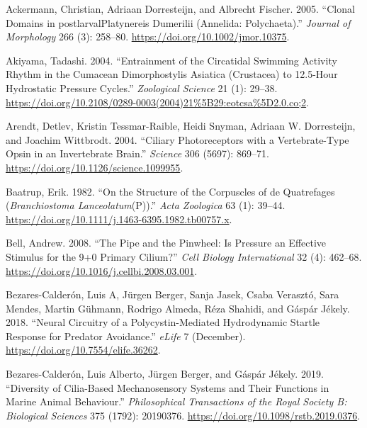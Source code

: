 \documentclass[
]{article}
\newlength{\cslhangindent}
\newlength{\cslentryspacingunit} %
\newenvironment{CSLReferences}[2] %
 {%
  \setlength{\parindent}{0pt}
  \ifodd #1
  \let\oldpar\par
  \def\par{\hangindent=\cslhangindent\oldpar}
  \fi
  \setlength{\parskip}{#2\cslentryspacingunit}
 }%
 {}
\begin{document}
\hypertarget{refs}{}
\begin{CSLReferences}{1}{0}
\leavevmode{}%
Ackermann, Christian, Adriaan Dorresteijn, and Albrecht Fischer. 2005.
{``Clonal Domains in postlarvalPlatynereis Dumerilii (Annelida:
Polychaeta).''} \emph{Journal of Morphology} 266 (3): 258--80.
\url{https://doi.org/10.1002/jmor.10375}.

\leavevmode{}%
Akiyama, Tadashi. 2004. {``Entrainment of the Circatidal Swimming
Activity Rhythm in the Cumacean Dimorphostylis Asiatica (Crustacea) to
12.5-Hour Hydrostatic Pressure Cycles.''} \emph{Zoological Science} 21
(1): 29--38.
\url{https://doi.org/10.2108/0289-0003(2004)21\%5B29:eotcsa\%5D2.0.co;2}.

\leavevmode{}%
Arendt, Detlev, Kristin Tessmar-Raible, Heidi Snyman, Adriaan W.
Dorresteijn, and Joachim Wittbrodt. 2004. {``Ciliary Photoreceptors with
a Vertebrate-Type Opsin in an Invertebrate Brain.''} \emph{Science} 306
(5697): 869--71. \url{https://doi.org/10.1126/science.1099955}.

\leavevmode{}%
Baatrup, Erik. 1982. {``On the Structure of the Corpuscles of de
Quatrefages ({\emph{Branchiostoma Lanceolatum}}(P)).''} \emph{Acta
Zoologica} 63 (1): 39--44.
\url{https://doi.org/10.1111/j.1463-6395.1982.tb00757.x}.

\leavevmode{}%
Bell, Andrew. 2008. {``The Pipe and the Pinwheel: Is Pressure an
Effective Stimulus for the 9+0 Primary Cilium?''} \emph{Cell Biology
International} 32 (4): 462--68.
\url{https://doi.org/10.1016/j.cellbi.2008.03.001}.

\leavevmode{}%
Bezares-Calderón, Luis A, Jürgen Berger, Sanja Jasek, Csaba Verasztó,
Sara Mendes, Martin Gühmann, Rodrigo Almeda, Réza Shahidi, and Gáspár
Jékely. 2018. {``Neural Circuitry of a Polycystin-Mediated Hydrodynamic
Startle Response for Predator Avoidance.''} \emph{eLife} 7 (December).
\url{https://doi.org/10.7554/elife.36262}.

\leavevmode{}%
Bezares-Calderón, Luis Alberto, Jürgen Berger, and Gáspár Jékely. 2019.
{``Diversity of Cilia-Based Mechanosensory Systems and Their Functions
in Marine Animal Behaviour.''} \emph{Philosophical Transactions of the
Royal Society B: Biological Sciences} 375 (1792): 20190376.
\url{https://doi.org/10.1098/rstb.2019.0376}.


\end{CSLReferences}
\end{document}

